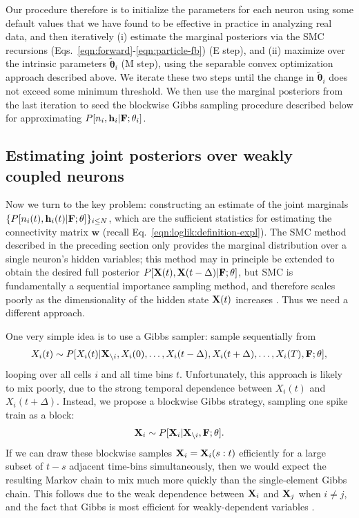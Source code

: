 \documentclass[aoas,preprint]{imsart}
\renewcommand{\i}{\backslash i}
\newcommand{\bth}{\mathbf{\theta}}
\newcommand{\w}{w}
\newcommand{\bw}{\mathbf{\w}}
\newcommand{\bF}{{\bf F}}
\newcommand{\bX}{{\bf X}}
\newcommand{\bh}{\mathbf{h}}
\newcommand{\tbth}{\tilde{\bth}}
\begin{document}
Our procedure therefore is to initialize the parameters for each
neuron using some default values that we have found to be effective in
practice in analyzing real data, and then iteratively (i) estimate the
marginal posteriors via the SMC recursions
(Eqs.~\ref{eqn:forward}-\ref{eqn:particle-fb}) (E step), and (ii)
maximize over the intrinsic parameters $\tbth_i$ (M step), using the
separable convex optimization approach described above. We iterate
these two steps until the change in $\tbth_i$ does not exceed some
minimum threshold. We then use the marginal posteriors from the last
iteration to seed the blockwise Gibbs sampling procedure described
below for approximating $P[n_i,\bh_i | \bF;\bth_i]$.

\subsection{Estimating joint posteriors over weakly coupled neurons}
\label{sec:methods:joint}

Now we turn to the key problem: constructing an estimate of the joint
marginals $\{P[n_i(t), \bh_i(t) | \bF;\bth]\}_{i\leq N}$, which are
the sufficient statistics for estimating the connectivity matrix $\bw$
(recall Eq.~\eqref{eqn:loglik:definition-expl}). The SMC method
described in the preceding section only provides the marginal
distribution over a single neuron's hidden variables; this method may
in principle be extended to obtain the desired full posterior
$P[\bX(t), \bX(t-\Delta) | \bF; \bth]$, but SMC is fundamentally a
sequential importance sampling method, and therefore scales poorly as
the dimensionality of the hidden state $\bX(t)$ increases
\cite{BickelBengtsson08}. Thus we need a different approach.

One very simple idea is to use a Gibbs sampler: sample sequentially
from
\begin{align}
X_i(t) \sim P[X_i(t) | \bX_{\i}, X_i(0), \ldots, X_i(t-\Delta),
 X_i(t+\Delta), \ldots, X_i(T), \bF; \bth],
\end{align}
looping over all cells $i$ and all time bins $t$. Unfortunately, this approach is likely to mix poorly, due to the strong temporal dependence between $X_i(t)$ and $X_i(t+\Delta)$. Instead, we propose a blockwise Gibbs strategy, sampling one spike train as a block:
\begin{align}
	\bX_i \sim P[\bX_i | \bX_{\i}, \bF; \bth].
\end{align}
If we can draw these blockwise samples $\bX_i = \bX_i(s:t)$
efficiently for a large subset of $t-s$ adjacent time-bins
simultaneously, then we would expect the resulting Markov chain to mix
much more quickly than the single-element Gibbs chain.  This follows
due to the weak dependence between $\bX_i$ and $\bX_j$ when $i\neq j$,
and the fact that Gibbs is most efficient for weakly-dependent
variables \cite{RC05}.
\end{document}
